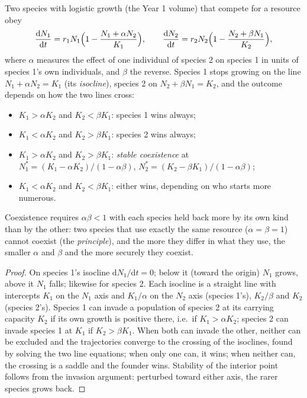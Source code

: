 \begin{theorem}\label{thm:b2:speciation:lv}
Two species with logistic growth (the Year 1 volume) that compete
for a resource obey
\[
\frac{\mathrm{d}N_1}{\mathrm{d}t} = r_1 N_1\Bigl(1 - \frac{N_1 + \alpha N_2}{K_1}\Bigr), \qquad
\frac{\mathrm{d}N_2}{\mathrm{d}t} = r_2 N_2\Bigl(1 - \frac{N_2 + \beta N_1}{K_2}\Bigr),
\]
where $\alpha$ measures the effect of one individual of species 2
on species 1 in units of species 1's own individuals, and $\beta$
the reverse. Species 1 stops growing on the line $N_1 + \alpha N_2 =
K_1$ (its \emph{isocline}), species 2 on $N_2 + \beta N_1 = K_2$, and
the outcome depends on how the two lines cross:
\begin{itemize}
  \item $K_1 > \alpha K_2$ and $K_2 < \beta K_1$: species 1 wins
        always;
  \item $K_1 < \alpha K_2$ and $K_2 > \beta K_1$: species 2 wins
        always;
  \item $K_1 > \alpha K_2$ and $K_2 > \beta K_1$: \emph{stable
        coexistence} at $N_1^{*} = (K_1 - \alpha K_2)/(1 - \alpha\beta)$,
        $N_2^{*} = (K_2 - \beta K_1)/(1 - \alpha\beta)$;
  \item $K_1 < \alpha K_2$ and $K_2 < \beta K_1$: either wins,
        depending on who starts more numerous.
\end{itemize}
Coexistence requires $\alpha\beta < 1$ with each species held back
more by its own kind than by the other: two species that use
exactly the same resource ($\alpha = \beta = 1$) cannot coexist
(the \emph{ principle}), and the more they
differ in what they use, the smaller $\alpha$ and $\beta$ and the
more securely they coexist.
\end{theorem}
\begin{proof}
On species 1's isocline $\mathrm{d}N_1/\mathrm{d}t = 0$; below it
(toward the origin) $N_1$ grows, above it $N_1$ falls; likewise for
species 2. Each isocline is a straight line with intercepts $K_1$
on the $N_1$ axis and $K_1/\alpha$ on the $N_2$ axis (species 1's),
$K_2/\beta$ and $K_2$ (species 2's). Species 1 can invade a
population of species 2 at its carrying capacity $K_2$ if its own
growth is positive there, i.e.\ if $K_1 > \alpha K_2$; species 2 can
invade species 1 at $K_1$ if $K_2 > \beta K_1$. When both can invade
the other, neither can be excluded and the trajectories converge to
the crossing of the isoclines, found by solving the two line
equations; when only one can, it wins; when neither can, the
crossing is a saddle and the founder wins. Stability of the interior
point follows from the invasion argument: perturbed toward either
axis, the rarer species grows back.
\end{proof}

